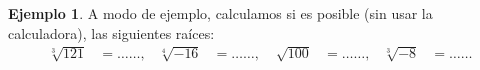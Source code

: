 \documentclass[12pt]{examdesign}
\theoremstyle{plain}
\theoremstyle{definition}
\newtheorem{exa}[theorem]{Ejemplo}
\theoremstyle{remark}
\begin{document}
\begin{endmatter}
\begin{tcolorbox}[opteqC]
\begin{exa}
				A modo de ejemplo, calculamos si es posible (sin usar la calculadora), las siguientes raíces:
				\begin{align*}
				\sqrt[3]{121}&=\dots\dots,&\sqrt[4]{-16}&=\dots\dots,&
				\sqrt[]{100}&=\dots\dots,&\sqrt[3]{-8}&=\dots\dots
				\end{align*}
			\end{exa}
		\end{tcolorbox}
	
		
	\end{endmatter}
\end{document}
